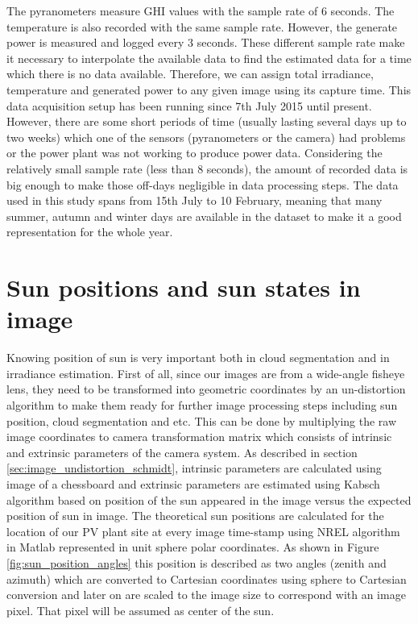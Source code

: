 The pyranometers measure GHI values with the sample rate of 6 seconds. The temperature is also recorded with the  same sample rate. However, the generate power is measured and logged every 3 seconds. These different sample rate make it necessary to interpolate the available data to find the estimated data for a time which there is no data available. Therefore, we can assign total irradiance, temperature and generated power to any given image using its capture time. This data acquisition setup has been running since 7th July 2015 until present. However, there are some short periods of time (usually lasting several days up to two weeks) which one of the sensors (pyranometers or the camera) had problems or the power plant was not working to produce power data. Considering the relatively small sample rate (less than 8 seconds), the amount of recorded data is big enough to make those off-days negligible in data processing steps. The data used in this study spans from 15th July to 10 February, meaning that many summer, autumn and winter days are available in the dataset to make it a good representation for the whole year. 


\section{Sun positions and sun states in image}
\label{sec:sun-states}
Knowing position of sun is very important both in cloud segmentation and in irradiance estimation. First of all, since our images are from a wide-angle fisheye lens, they need to be transformed into geometric coordinates by an un-distortion algorithm to make them ready for further image processing steps including sun position, cloud segmentation and etc. This can be done by multiplying the raw image coordinates to camera transformation matrix which consists of intrinsic and extrinsic parameters of the camera system. As described in section \ref{sec:image_undistortion_schmidt}, intrinsic parameters are calculated using image of a chessboard\cite{fisheye_undistort} and extrinsic parameters are estimated using Kabsch algorithm\cite{Kabsch_alg} based on position of the sun appeared in the image versus the expected position of sun in image. The theoretical sun positions are calculated for the location of our PV plant site at every image time-stamp using NREL algorithm \cite{our_sun_position} in Matlab represented in unit sphere polar coordinates. As shown in Figure \ref{fig:sun_position_angles} this position is described as two angles (zenith and azimuth) which are converted to Cartesian coordinates using sphere to Cartesian conversion and later on are scaled to the image size to correspond with an image pixel. That pixel will be assumed as center of the sun.

